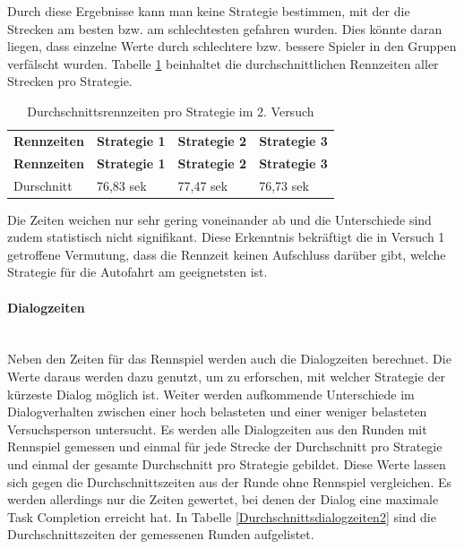 \documentclass[12pt,a4paper]{scrartcl}
\begin{document}
Durch diese Ergebnisse kann man keine Strategie bestimmen, mit der die Strecken am besten bzw. am schlechtesten gefahren wurden.
Dies könnte daran liegen, dass einzelne Werte durch schlechtere bzw. bessere Spieler in den Gruppen verfälscht wurden. Tabelle \ref{RennZeitenDis2} beinhaltet die durchschnittlichen Rennzeiten aller Strecken pro Strategie. 

\begin{longtable}{p{3cm}p{3cm}p{3cm}p{3cm} }
	\label{RennZeitenDis2}\\
	\caption[Durchschnittsrennzeiten pro Strategie im 2. Versuch]{Durchschnittsrennzeiten pro Strategie im 2. Versuch}\\
	\hline
	\textbf{Rennzeiten}&\textbf{Strategie 1}&\textbf{Strategie 2} &\textbf{Strategie 3}\\
	\hline
	\endfirsthead
	\hline
	\textbf{Rennzeiten}&\textbf{Strategie 1}&\textbf{Strategie 2} &\textbf{Strategie 3}\\
	\hline
	\endhead
Durschnitt & 76,83 sek & 77,47 sek & 76,73 sek \\
\hline
\end{longtable}
Die Zeiten weichen nur sehr gering voneinander ab und die Unterschiede sind zudem statistisch nicht signifikant. Diese Erkenntnis bekräftigt die in Versuch 1 getroffene Vermutung, dass die Rennzeit keinen Aufschluss darüber gibt, welche Strategie für die Autofahrt am geeignetsten ist. 

\paragraph{Dialogzeiten}
~\\
Neben den Zeiten für das Rennspiel werden auch die Dialogzeiten berechnet. 
Die Werte daraus werden dazu genutzt, um zu erforschen, mit welcher Strategie der kürzeste Dialog möglich ist. Weiter werden aufkommende Unterschiede im Dialogverhalten zwischen einer hoch belasteten und einer weniger belasteten Versuchsperson untersucht. 
Es werden alle Dialogzeiten aus den Runden mit Rennspiel gemessen und einmal für jede Strecke der Durchschnitt pro Strategie und einmal der gesamte Durchschnitt pro Strategie gebildet. Diese Werte lassen sich gegen die Durchschnittszeiten aus der Runde ohne Rennspiel vergleichen. Es werden allerdings nur die Zeiten gewertet, bei denen der Dialog eine maximale Task Completion erreicht hat.
In Tabelle \ref{Durchschnittsdialogzeiten2} sind die Durchschnittszeiten der gemessenen Runden aufgelistet.
\end{document}
